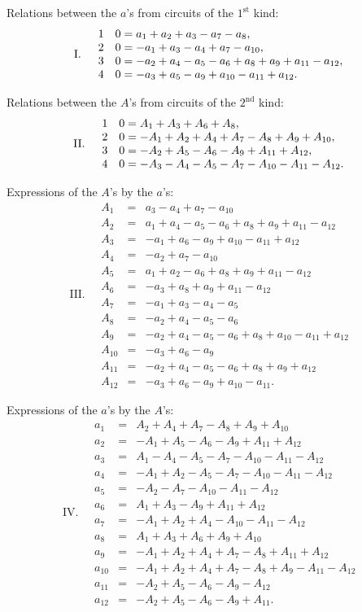 \documentclass[10pt]{article}
\begin{document}
\noindent Relations between the \(a\)'s from circuits of the \(1^{\mathrm{st}}\) kind:
\[
\mathrm{I.}\quad
\begin{array}{r@{\quad}l}
1&0=a_1+a_2+a_3-a_7-a_8,\\
2&0=-a_1+a_3-a_4+a_7-a_{10},\\
3&0=-a_2+a_4-a_5-a_6+a_8+a_9+a_{11}-a_{12},\\
4&0=-a_3+a_5-a_9+a_{10}-a_{11}+a_{12}.
\end{array}
\]

\noindent Relations between the \(A\)'s from circuits of the \(2^{\mathrm{nd}}\) kind:
\[
\mathrm{II.}\quad
\begin{array}{r@{\quad}l}
1&0=A_1+A_3+A_6+A_8,\\
2&0=-A_1+A_2+A_4+A_7-A_8+A_9+A_{10},\\
3&0=-A_2+A_5-A_6-A_9+A_{11}+A_{12},\\
4&0=-A_3-A_4-A_5-A_7-A_{10}-A_{11}-A_{12}.
\end{array}
\]

\noindent Expressions of the \(A\)'s by the \(a\)'s:
\[
\mathrm{III.}\quad
\begin{array}{rcl}
A_1&=&a_3-a_4+a_7-a_{10}\\
A_2&=&a_1+a_4-a_5-a_6+a_8+a_9+a_{11}-a_{12}\\
A_3&=&-a_1+a_6-a_9+a_{10}-a_{11}+a_{12}\\
A_4&=&-a_2+a_7-a_{10}\\
A_5&=&a_1+a_2-a_6+a_8+a_9+a_{11}-a_{12}\\
A_6&=&-a_3+a_8+a_9+a_{11}-a_{12}\\
A_7&=&-a_1+a_3-a_4-a_5\\
A_8&=&-a_2+a_4-a_5-a_6\\
A_9&=&-a_2+a_4-a_5-a_6+a_8+a_{10}-a_{11}+a_{12}\\
A_{10}&=&-a_3+a_6-a_9\\
A_{11}&=&-a_2+a_4-a_5-a_6+a_8+a_9+a_{12}\\
A_{12}&=&-a_3+a_6-a_9+a_{10}-a_{11}.
\end{array}
\]

\noindent Expressions of the \(a\)'s by the \(A\)'s:
\[
\mathrm{IV.}\quad
\begin{array}{rcl}
a_1&=&A_2+A_4+A_7-A_8+A_9+A_{10}\\
a_2&=&-A_1+A_5-A_6-A_9+A_{11}+A_{12}\\
a_3&=&A_1-A_4-A_5-A_7-A_{10}-A_{11}-A_{12}\\
a_4&=&-A_1+A_2-A_5-A_7-A_{10}-A_{11}-A_{12}\\
a_5&=&-A_2-A_7-A_{10}-A_{11}-A_{12}\\
a_6&=&A_1+A_3-A_9+A_{11}+A_{12}\\
a_7&=&-A_1+A_2+A_4-A_{10}-A_{11}-A_{12}\\
a_8&=&A_1+A_3+A_6+A_9+A_{10}\\
a_9&=&-A_1+A_2+A_4+A_7-A_8+A_{11}+A_{12}\\
a_{10}&=&-A_1+A_2+A_4+A_7-A_8+A_9-A_{11}-A_{12}\\
a_{11}&=&-A_2+A_5-A_6-A_9-A_{12}\\
a_{12}&=&-A_2+A_5-A_6-A_9+A_{11}.
\end{array}
\]
\end{document}
